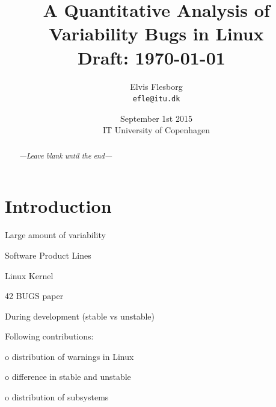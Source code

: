 \documentclass[a4paper,11pt]{report}
\begin{document}
\setlength{\parindent}{0cm}
\setlength{\unitlength}{1mm}

\date{September 1st 2015\\ IT University of Copenhagen}
\title{A Quantitative Analysis of Variability Bugs in Linux \\ Draft: \today~\currenttime}
\author{Elvis Flesborg\\
\texttt{efle@itu.dk}}
\clearpage\maketitle
\thispagestyle{empty}
\newpage

\tableofcontents
\thispagestyle{empty}



\newpage

\setcounter{page}{1}


\begin{abstract}
    \emph{---Leave blank until the end---}

\end{abstract}


\chapter{Introduction}
Large amount of variability

Software Product Lines

Linux Kernel

42 BUGS paper

During development (stable vs unstable)

Following contributions:

o distribution of warnings in Linux

o difference in stable and unstable

o distribution of subsystems




\newpage
\end{document}
